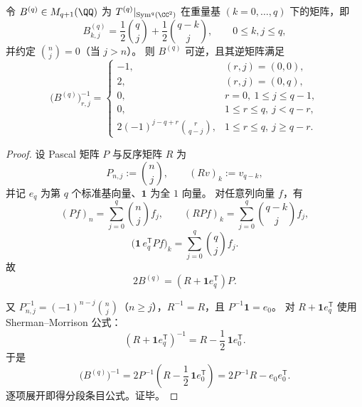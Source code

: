 \begin{theorem}[重量表示矩阵的显式整数逆]\label{thm:conclusion-softcore-weight-matrix-explicit-inverse}
令 \(B^{(q)}\in M_{q+1}(\QQ)\) 为
\(
T^{(q)}|_{\operatorname{Sym}^q(\CC^2)}
\)
在重量基 \((k=0,\dots,q)\) 下的矩阵，即
\[
B^{(q)}_{k,j}
=\frac12\binom{q}{j}+\frac12\binom{q-k}{j},
\qquad 0\le k,j\le q,
\]
并约定 \(\binom{n}{j}=0\)（当 \(j>n\)）。
则 \(B^{(q)}\) 可逆，且其逆矩阵满足
\[
\bigl(B^{(q)}\bigr)^{-1}_{r,j}=
\begin{cases}
-1,&(r,j)=(0,0),\\[3pt]
2,&(r,j)=(0,q),\\[3pt]
0,&r=0,\ 1\le j\le q-1,\\[3pt]
0,&1\le r\le q,\ j<q-r,\\[4pt]
2(-1)^{j-q+r}\binom{r}{q-j},&1\le r\le q,\ j\ge q-r.
\end{cases}
\]
\end{theorem}
\begin{proof}
设 Pascal 矩阵 \(P\) 与反序矩阵 \(R\) 为
\[
P_{n,j}:=\binom{n}{j},\qquad
(Rv)_k:=v_{q-k},
\]
并记 \(e_q\) 为第 \(q\) 个标准基向量、\(\mathbf 1\) 为全 \(1\) 向量。
对任意列向量 \(f\)，有
\[
(Pf)_n=\sum_{j=0}^{q}\binom{n}{j}f_j,\qquad
(RPf)_k=\sum_{j=0}^{q}\binom{q-k}{j}f_j,
\]
\[
\bigl(\mathbf 1\,e_q^{\mathsf T}Pf\bigr)_k
=\sum_{j=0}^{q}\binom{q}{j}f_j.
\]
故
\[
2B^{(q)}=(R+\mathbf 1 e_q^{\mathsf T})P.
\]

又 \(P^{-1}_{n,j}=(-1)^{n-j}\binom{n}{j}\)（\(n\ge j\)），\(R^{-1}=R\)，且 \(P^{-1}\mathbf 1=e_0\)。
对 \(R+\mathbf 1e_q^{\mathsf T}\) 使用 Sherman--Morrison 公式：
\[
(R+\mathbf 1e_q^{\mathsf T})^{-1}
=R-\frac12\,\mathbf 1e_0^{\mathsf T}.
\]
于是
\[
\bigl(B^{(q)}\bigr)^{-1}
=2P^{-1}\!\left(R-\frac12\,\mathbf 1e_0^{\mathsf T}\right)
=2P^{-1}R-e_0e_0^{\mathsf T}.
\]
逐项展开即得分段条目公式。证毕。
\end{proof}

